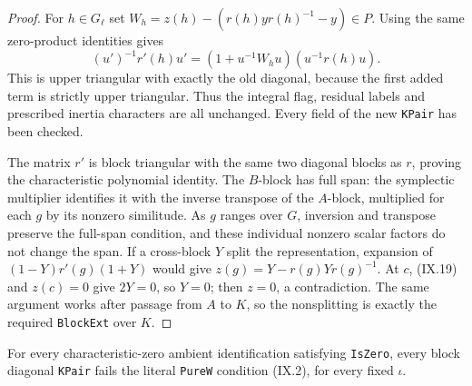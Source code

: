 \begin{proof}
For $h\in G_\ell$ set
$W_h=z(h)-(r(h)yr(h)^{-1}-y)\in P$.
Using the same zero-product identities gives
\[
 (u')^{-1}r'(h)u'
           =(1+u^{-1}W_hu)(u^{-1}r(h)u).
 \tag{IX.21}
\]
This is upper triangular with exactly the old diagonal,
because the first added term is strictly upper triangular.
Thus the integral flag, residual labels and prescribed
inertia characters are all unchanged.  Every field of
the new \texttt{KPair} has been checked.

The matrix $r'$ is block triangular with the same two
diagonal blocks as $r$, proving the characteristic
polynomial identity.  The $B$-block has full span:
the symplectic multiplier identifies it with the
inverse transpose of the $A$-block, multiplied for
each $g$ by its nonzero similitude.  As $g$ ranges over
$G$, inversion and transpose preserve the full-span
condition, and these individual nonzero scalar factors
do not change the span.
If a cross-block $Y$ split the representation, expansion
of $(1-Y)r'(g)(1+Y)$ would give
$z(g)=Y-r(g)Yr(g)^{-1}$.
At $c$, (IX.19) and $z(c)=0$ give $2Y=0$, so $Y=0$;
then $z=0$, a contradiction.  The same argument works
after passage from $A$ to $K$, so the nonsplitting is
exactly the required \texttt{BlockExt} over $K$.
\end{proof}

\begin{proposition}
\label{claim:IX7}
For every characteristic-zero ambient identification
satisfying \texttt{IsZero}, every block diagonal
\texttt{KPair} fails the literal \texttt{PureW} condition
(IX.2), for every fixed $\iota$.
\end{proposition}

